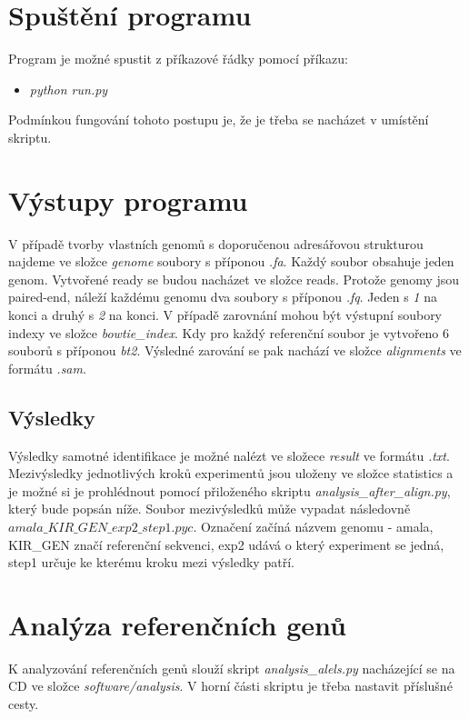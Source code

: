 \documentclass[czech,DP]{thesiskiv}
\numberwithin{equation}{section}
\begin{document}
\section{Spuštění programu}
Program je možné spustit z příkazové řádky pomocí příkazu: 

\begin{itemize}
 \item \colorbox{gray!15}{\textit{python run.py}}
\end{itemize}

\noindent
Podmínkou fungování tohoto postupu je, že je třeba se nacházet v umístění skriptu. 

\section{Výstupy programu}
V případě tvorby vlastních genomů s doporučenou adresářovou strukturou najdeme ve složce \textit{genome} soubory s příponou \textit{.fa}. Každý soubor obsahuje jeden genom.
Vytvořené ready se budou nacházet ve složce reads. Protože genomy jsou paired-end, náleží každému genomu dva soubory s příponou \textit{.fq}. Jeden s \textit{1} na konci a druhý s \textit{2} na konci. 
V případě zarovnání mohou být výstupní soubory indexy ve složce \textit{bowtie\_index}. Kdy pro každý referenční soubor je vytvořeno 6 souborů s příponou \textit{bt2}. Výsledné zarování se pak nachází ve složce \textit{alignments} ve formátu \textit{.sam}. 

\subsection{Výsledky}
Výsledky samotné identifikace je možné nalézt ve složece \textit{result} ve formátu \textit{.txt}. Mezivýsledky jednotlivých kroků experimentů jsou uloženy ve složce statistics a je možné si je prohlédnout pomocí přiloženého skriptu \textit{analysis\_after\_align.py}, který bude popsán níže. Soubor mezivýsledků může vypadat následovně $amala\_KIR\_GEN\_exp2\_step1.pyc$.  Označení začíná názvem genomu - amala, KIR\_GEN značí referenční sekvenci, exp2 udává o který experiment se jedná, step1 určuje ke kterému kroku mezi výsledky patří. 



\section{Analýza referenčních genů}
K analyzování referenčních genů slouží skript \textit{analysis\_alels.py} nacházející se na CD ve složce \textit{software/analysis}. V horní části skriptu je třeba nastavit příslušné cesty.
\end{document}
